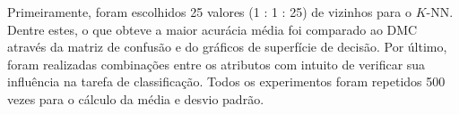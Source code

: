 \documentclass{article}
\begin{document}
Primeiramente, foram escolhidos 25 valores (1 : 1 : 25)  de vizinhos para o $K$-NN. Dentre estes, o que obteve a maior acurácia média foi comparado ao DMC através da matriz de confusão e do gráficos de superfície de decisão. Por último, foram realizadas combinações entre os atributos com intuito de verificar sua influência na tarefa de classificação. Todos os experimentos foram repetidos 500 vezes para o cálculo da média e desvio padrão. 





%
%

\end{document}
